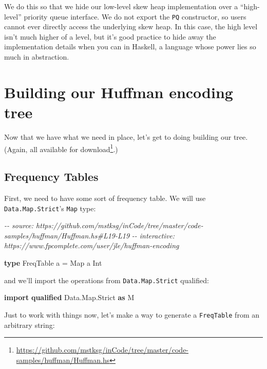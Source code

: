 \documentclass[]{article}
\newenvironment{Shaded}{}{}
\newcommand{\CommentTok}[1]{\textcolor[rgb]{0.38,0.63,0.69}{\textit{#1}}}
\newcommand{\DataTypeTok}[1]{\textcolor[rgb]{0.56,0.13,0.00}{#1}}
\newcommand{\KeywordTok}[1]{\textcolor[rgb]{0.00,0.44,0.13}{\textbf{#1}}}
\newcommand{\NormalTok}[1]{#1}
\newcommand{\OtherTok}[1]{\textcolor[rgb]{0.00,0.44,0.13}{#1}}
\renewcommand{\href}[2]{#2\footnote{\url{#1}}}
\begin{document}
We do this so that we hide our low-level skew heap implementation over a
``high-level'' priority queue interface. We do not export the \texttt{PQ}
constructor, so users cannot ever directly access the underlying skew heap. In
this case, the high level isn't much higher of a level, but it's good practice
to hide away the implementation details when you can in Haskell, a language
whose power lies so much in abstraction.

\section{Building our Huffman encoding
tree}\label{building-our-huffman-encoding-tree}

Now that we have what we need in place, let's get to doing building our tree.
(Again, all available
\href{https://github.com/mstksg/inCode/tree/master/code-samples/huffman/Huffman.hs}{for
download}.)

\subsection{Frequency Tables}\label{frequency-tables}

First, we need to have some sort of frequency table. We will use
\texttt{Data.Map.Strict}'s \texttt{Map} type:

\begin{Shaded}
\begin{Highlighting}[]
\CommentTok{{-}{-} source: https://github.com/mstksg/inCode/tree/master/code{-}samples/huffman/Huffman.hs\#L19{-}L19}
\CommentTok{{-}{-} interactive: https://www.fpcomplete.com/user/jle/huffman{-}encoding}

\KeywordTok{type} \DataTypeTok{FreqTable}\NormalTok{ a }\OtherTok{=} \DataTypeTok{Map}\NormalTok{ a }\DataTypeTok{Int}
\end{Highlighting}
\end{Shaded}

and we'll import the operations from \texttt{Data.Map.Strict} qualified:

\begin{Shaded}
\begin{Highlighting}[]
\KeywordTok{import} \KeywordTok{qualified} \DataTypeTok{Data.Map.Strict} \KeywordTok{as} \DataTypeTok{M}
\end{Highlighting}
\end{Shaded}

Just to work with things now, let's make a way to generate a \texttt{FreqTable}
from an arbitrary string:
\end{document}

